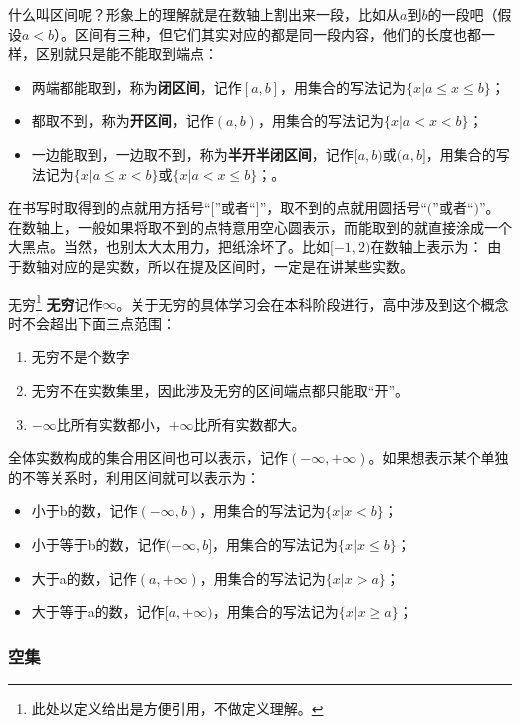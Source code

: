 什么叫区间呢？形象上的理解就是在数轴上割出来一段，比如从$a$到$b$的一段吧（假设$a<b$）。区间有三种，但它们其实对应的都是同一段内容，他们的长度也都一样，区别就只是能不能取到端点：
\begin{itemize}
\item 两端都能取到，称为\textbf{闭区间}，记作$[a,b]$，用集合的写法记为$\{x|a\leq x\leq b\}$；
\item 都取不到，称为\textbf{开区间}，记作$(a,b)$，用集合的写法记为$\{x|a< x<b\}$；
\item 一边能取到，一边取不到，称为\textbf{半开半闭区间}，记作$[a,b)$或$(a,b]$，用集合的写法记为$\{x|a\leq x< b\}$或$\{x|a< x\leq b\}$；。
\end{itemize}
在书写时取得到的点就用方括号“$[$”或者“$]$”，取不到的点就用圆括号“$($”或者“$)$”。
在数轴上，一般如果将取不到的点特意用空心圆表示，而能取到的就直接涂成一个大黑点。当然，也别太大太用力，把纸涂坏了。比如$[-1,2)$在数轴上表示为：
\addTODO{画个数轴的图，[-1,2)的区间}
由于数轴对应的是实数，所以在提及区间时，一定是在讲某些实数。

\begin{definition}{无穷\footnote{此处以定义给出是方便引用，不做定义理解。}}
\textbf{无穷}记作$\infty$。关于无穷的具体学习会在本科阶段进行，高中涉及到这个概念时不会超出下面三点范围：
\begin{enumerate}
\item 无穷不是个数字
\item 无穷不在实数集里，因此涉及无穷的区间端点都只能取“开”。
\item $-\infty$比所有实数都小，$+\infty$比所有实数都大。
\end{enumerate}
\end{definition}

全体实数构成的集合用区间也可以表示，记作$(-\infty,+\infty)$。如果想表示某个单独的不等关系时，利用区间就可以表示为：
\begin{itemize}
\item 小于b的数，记作$(-\infty,b)$，用集合的写法记为$\{x|x< b\}$；
\item 小于等于b的数，记作$(-\infty,b]$，用集合的写法记为$\{x|x\leq b\}$；
\item 大于a的数，记作$(a,+\infty)$，用集合的写法记为$\{x|x> a\}$；
\item 大于等于a的数，记作$[a,+\infty)$，用集合的写法记为$\{x|x\geq a\}$；
\end{itemize}

\subsubsection{空集}

